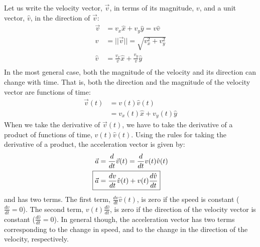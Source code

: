 Let us write the velocity vector, $\vec v$, in terms of its magnitude, $v$, and a unit vector, $\hat v$, in the direction of $\vec v$:
\begin{align*}
\vec v &=v_x\hat x+v_y\hat y= v \hat v\\
v&=||\vec v||=\sqrt{v_x^2+v_y^2}\\
\hat v &= \frac{v_x}{v}\hat x+\frac{v_y}{v}\hat y\\
\end{align*}
In the most general case, both the magnitude of the velocity and its direction can change with time. That is, both the direction and the magnitude of the velocity vector are functions of time:
\begin{align*}
\vec v(t)&=v(t)\hat v(t)\\
&=v_x(t)\hat x+v_y(t)\hat y
\end{align*}
When we take the derivative of $\vec v(t)$, we have to take the derivative of a product of functions of time, $v(t)\hat v(t)$. Using the rules for taking the derivative of a product, the acceleration vector is given by:
\begin{align}
\label{eqn:chap4:avecdef2}
\vec a &= \frac{d}{dt}\vec v(t)= \frac{d}{dt}v(t)\hat v(t)\nonumber\\
\Aboxed{\vec a&=\frac{dv}{dt}\hat v(t)+v(t)\frac{d\hat v}{dt}}
\end{align}
and has two terms. The first term, $\frac{dv}{dt}\hat v(t)$, is zero if the speed is constant ($\frac{dv}{dt}=0$). The second term, $v(t)\frac{d\hat v}{dt}$, is zero if the direction of the velocity vector is constant ($\frac{d\hat v}{dt}=0$). In general though, the acceleration vector has two terms corresponding to the change in speed, and to the change in the direction of the velocity, respectively.

